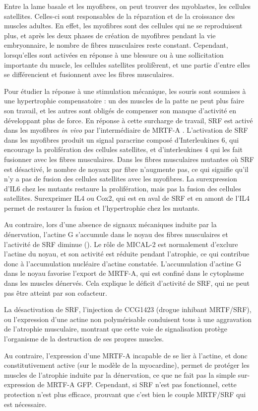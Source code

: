 \documentclass{report}
\begin{document}
Entre la lame basale et les myofibres, on peut trouver des myoblastes, les cellules satellites. Celles-ci sont responsables de la réparation et de la croissance des muscles adultes. 
En effet, les myofibres sont des cellules qui ne se reproduisent plus, et après les deux phases de création de myofibres pendant la vie embryonnaire, le nombre de fibres musculaires reste constant. 
Cependant, lorsqu'elles sont activées en réponse à une blessure ou à une sollicitation importante du muscle, les cellules satellites prolifèrent, et une partie d'entre elles se différencient et fusionnent avec les fibres musculaires. 

Pour étudier la réponse à une stimulation mécanique, les souris sont soumises à une hypertrophie compensatoire : un des muscles de la patte ne peut plus faire son travail, et les autres sont obligés de compenser son manque d'activité en développant plus de force. En réponse à cette surcharge de travail, SRF est activé dans les myofibres \textit{in vivo} par l'intermédiaire de MRTF-A  \cite{guerci_srf-dependent_2012}. 
L'activation de SRF dans les myofibres produit un signal paracrine composé d'Interleukines 6, qui encourage la prolifération des cellules satellites, et d'interleukines 4 qui les fait fusionner avec les fibres musculaires. 
Dans les fibres musculaires mutantes où SRF est désactivé, le nombre de noyaux par fibre n'augmente pas, ce qui signifie qu'il n'y a pas de fusion des cellules satellites avec les myofibres. La surexpression d'IL6 chez les mutants restaure la prolifération, mais pas la fusion des cellules satellites. Surexprimer IL4 ou Cox2, qui est en aval de SRF et en amont de l'IL4 permet de restaurer la fusion et l'hypertrophie chez les mutants. 


Au contraire, lors d'une absence de signaux mécaniques induite par la dénervation, l'actine G s'accumule dans le noyau des fibres musculaires et l'activité de SRF diminue (\cite{collard_nuclear_2014}). Le rôle de MICAL-2 est normalement d'exclure l'actine du noyau, et son activité est réduite pendant l'atrophie, ce qui contribue donc à l'accumulation nucléaire d'actine constatée. 
L'accumulation d'actine G dans le noyau favorise l'export de MRTF-A, qui est confiné dans le cytoplasme dans les muscles dénervés. Cela explique le déficit d'activité de SRF, qui ne peut pas être atteint par son cofacteur. 

La désactivation de SRF, l'injection de CCG1423 (drogue inhibant MRTF/SRF), ou l'expression d'une actine non polymérisable conduisent tous à une aggravation de l'atrophie musculaire, montrant que cette voie de signalisation protège l'organisme de la destruction de ses propres muscles. 

Au contraire, l'expression d'une MRTF-A incapable de se lier à l'actine, et donc constitutivement active (sur le modèle de la myocardine), permet de protéger les muscles de l'atrophie induite par la dénervation, ce que ne fait pas la simple sur-expression de MRTF-A GFP. Cependant, si SRF n'est pas fonctionnel, cette protection n'est plus efficace, prouvant que c'est bien le couple MRTF/SRF qui est nécessaire. 
\end{document}
